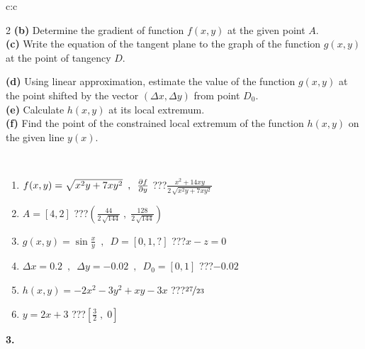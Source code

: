 \documentclass[10pt]{report}
\begin{document}
\begin{tabular}{c:c}
\begin{minipage}[c][104.5mm][t]{0.5\linewidth}
\begin{center}
\begin{minipage}{0.95\linewidth}
\begin{center}
{\begin{multicols}{2}
\textbf{(b)} Determine the gradient of function \(f(x,y)\) at the given point \(A\). \\[1mm]
\textbf{(c)} Write the equation of the tangent plane to the graph of the function \(g(x,y)\) at the point of tangency \(D\). \par \columnbreak
\textbf{(d)} Using linear approximation, estimate the value of the function \(g(x,y)\) at the point shifted by the vector \((\Delta x, \Delta y)\) from point \(D_0\). \\[1mm]
\textbf{(e)} Calculate \(h(x,y)\) at its local extremum. \\[1mm]
\textbf{(f)} Find the point of the constrained local extremum of the function \(h(x,y)\) on the given line \(y(x)\). \\[1mm]
\end{multicols}
}
\end{center}
\end{minipage}
\\[4mm]
\begin{minipage}{0.79\linewidth}
\begin{center}
\begin{varwidth}{\linewidth}
\begin{enumerate}
\normalsizerr
\item $f(x,y) = \sqrt{x^2y + 7xy^2}\enspace , \enspace \pdv{f}{y}$\quad \dotfill\; ???\;\dotfill \quad $\frac{x^2+14xy}{2\,\sqrt{x^2y+7xy^2}}$
\item $A = [4, 2]$\quad \dotfill\; ???\;\dotfill \quad $\left( \frac{44}{2\,\sqrt{144}} \;,\; \frac{128}{2\,\sqrt{144}} \right)$
\item $g(x,y) = \sin\frac{x}{y} \enspace , \enspace D = [0, 1, ?]$\quad \dotfill\; ???\;\dotfill \quad $x-z=0$
\item $\Delta x = {0.2} \enspace,\enspace \Delta y = {-0.02} \enspace,\enspace D_0 = [0,1]$\quad \dotfill\; ???\;\dotfill \quad $-0.02$
\item $h(x,y) = -2x^2-3y^2+xy-3x$\quad \dotfill\; ???\;\dotfill \quad $\nicefrac{27}{23}$
\item $y = 2x+3$\quad \dotfill\; ???\;\dotfill \quad $\left[\frac{3}{2}\;,\;0\right]$
\end{enumerate}
\end{varwidth}
\end{center}
\end{minipage}
\begin{minipage}{0.20\linewidth}
\begin{center}
{\Huge\bfseries 3.} \\[2mm]

\end{center}
\end{minipage}
\end{center}
\end{minipage}
\end{tabular}
\end{document}
